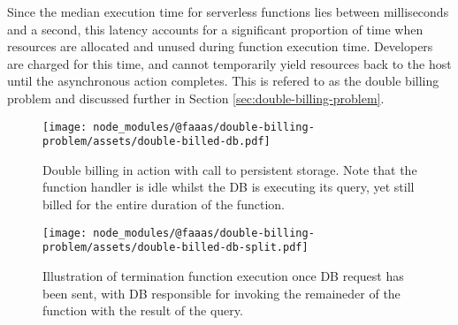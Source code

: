 Since the median execution time for serverless functions lies between milliseconds and a second\cite{eismannReviewServerlessUse2020}, this latency accounts for a significant proportion of time when resources are allocated and unused during function execution time. Developers are charged for this time, and cannot temporarily yield resources back to the host until the asynchronous action completes. This is refered to as the double billing problem\cite{baldiniServerlessTrilemmaFunction2017,yuCharacterizingServerlessPlatforms2020} and discussed further in Section \ref{sec:double-billing-problem}.

\begin{figure}[t]
    \texttt{[image: node\_modules/@faaas/double-billing-problem/assets/double-billed-db.pdf]}
    \caption{Double billing in action with call to persistent storage. Note that the function handler is idle whilst the DB is executing its query, yet still billed for the entire duration of the function.}
    \label{fig:double-billing-db}
\end{figure}

\begin{figure}[t]
    \texttt{[image: node\_modules/@faaas/double-billing-problem/assets/double-billed-db-split.pdf]}
    \caption{Illustration of termination function execution once DB request has been sent, with DB responsible for invoking the remaineder of the function with the result of the query.}
    \label{fig:double-billing-db-split}
\end{figure}
